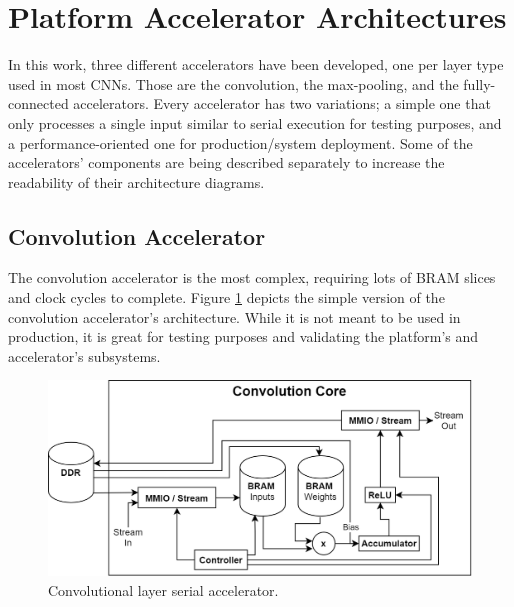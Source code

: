 \section{Platform Accelerator Architectures}
\label{sec:Platform-Accelerator-Architectures}
In this work, three different accelerators have been developed, one per layer type used in most CNNs. Those are the convolution, the max-pooling, and the fully-connected accelerators. Every accelerator has two variations; a simple one that only processes a single input similar to serial execution for testing purposes, and a performance-oriented one for production/system deployment. Some of the accelerators' components are being described separately to increase the readability of their architecture diagrams.

\subsection{Convolution Accelerator}
The convolution accelerator is the most complex, requiring lots of BRAM slices and clock cycles to complete. Figure \ref{fig:conv-core-serial} depicts the simple version of the convolution accelerator's architecture. While it is not meant to be used in production, it is great for testing purposes and validating the platform's and accelerator's subsystems.

\begin{figure} [H]
	\centering
	\includegraphics[width=\textwidth]{Images/Platform/Conv_core_serial.png}
	\decoRule
	\caption[Convolutional layer serial accelerator]{Convolutional layer serial accelerator.}
	\label{fig:conv-core-serial}
\end{figure}

